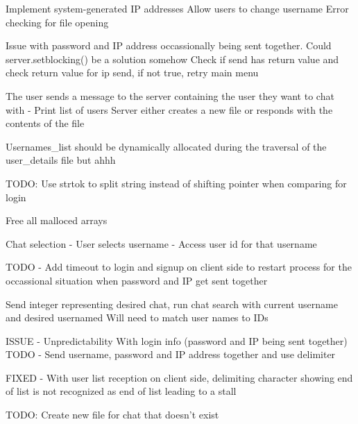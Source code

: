 Implement system-generated IP addresses
Allow users to change username
Error checking for file opening

Issue with password and IP address occassionally being sent together. 
    Could server.setblocking() be a solution somehow
    Check if send has return value and check return value for ip send, if not true, retry main menu

The user sends a message to the server containing the user they want to chat with
 - Print list of users 
Server either creates a new file or responds with the contents of the file    

Usernames_list should be dynamically allocated during the traversal of the user_details file but ahhh

TODO: Use strtok to split string instead of shifting pointer when comparing for login

Free all malloced arrays

Chat selection 
- User selects username 
- Access user id for that username

TODO - Add timeout to login and signup on client side to restart process for the occassional situation when password and IP get sent together

Send integer representing desired chat, run chat search with current username and desired usernamed
Will need to match user names to IDs 

ISSUE - Unpredictability With login info (password and IP being sent together)
TODO - Send username, password and IP address together and use delimiter

 FIXED - With user list reception on client side, delimiting character showing end of list is not recognized as end of list leading to a stall

TODO: Create new file for chat that doesn't exist